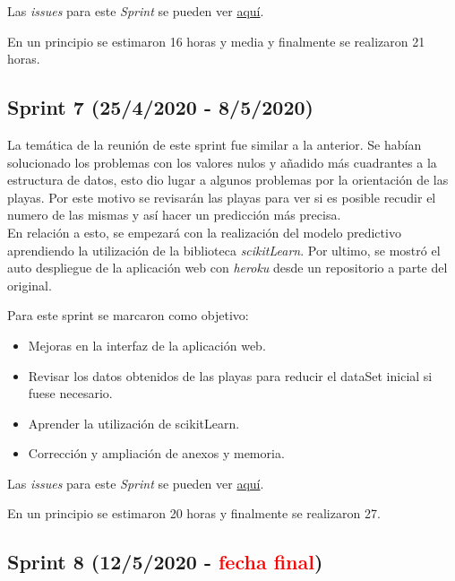 Las \emph{issues} para este \emph{Sprint} se pueden ver \href{https://github.com/psnti/TFG-Pablo-Santidrian-Tudanca/milestone/6}{aquí}.


En un principio se estimaron 16 horas y media y finalmente se realizaron 21 horas.

\subsection{Sprint 7 (25/4/2020 - 8/5/2020)}\label{Sprint-5}

La temática de la reunión de este sprint fue similar a la anterior. Se habían solucionado los problemas con los valores nulos y añadido más cuadrantes a la estructura de datos, esto dio lugar a algunos problemas por la orientación de las playas. Por este motivo se revisarán las playas para ver si es posible recudir el numero de las mismas y así hacer un predicción más precisa.\\
En relación a esto, se empezará con la realización del modelo predictivo aprendiendo la utilización de la biblioteca \emph{scikitLearn}.
Por ultimo, se mostró el auto despliegue de la aplicación web con \emph{heroku} desde un repositorio a parte del original.

Para este sprint se marcaron como objetivo:
\begin{itemize}
	\item Mejoras en la interfaz de la aplicación web.
	\item Revisar los datos obtenidos de las playas para reducir el dataSet inicial si fuese necesario.
	\item Aprender la utilización de scikitLearn.
	\item Corrección y ampliación de anexos y memoria.
\end{itemize} 

Las \emph{issues} para este \emph{Sprint} se pueden ver \href{https://github.com/psnti/TFG-Pablo-Santidrian-Tudanca/milestone/7}{aquí}.


En un principio se estimaron 20 horas y finalmente se realizaron 27.

\subsection{Sprint 8 (12/5/2020 - \textcolor{red}{fecha final})}\label{Sprint-5}

